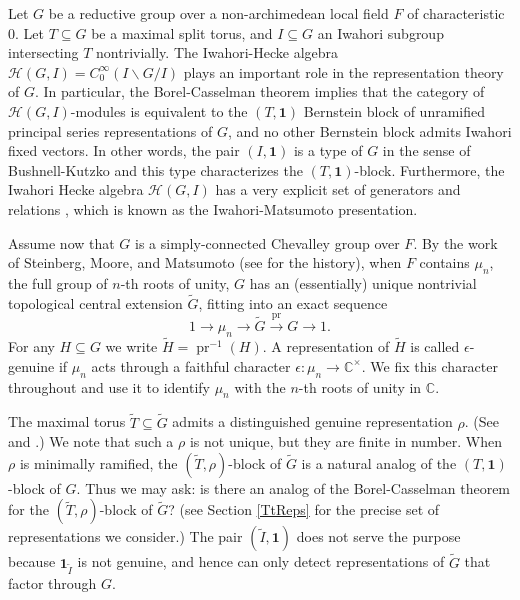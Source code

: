 \documentclass[10pt, letterpaper]{amsart}
\theoremstyle{plain}
\theoremstyle{definition}
\numberwithin{equation}{section}
\newcommand{\pr}{\operatorname{pr}}
\newcommand{\Gt}{\widetilde{G}}
\newcommand{\Ht}{\widetilde{H}}
\newcommand{\It}{\widetilde{I}}
\newcommand{\Tt}{\widetilde{T}}
\newcommand{\Hcal}{\mathcal{H}}
\newcommand{\one}{\mathbf{1}}
\begin{document}
Let $G$ be a reductive group over a non-archimedean local field $F$ of characteristic 0. Let $T\subseteq G$ be a maximal split torus, and $I\subseteq G$ an Iwahori subgroup intersecting $T$ nontrivially. The Iwahori-Hecke algebra $\Hcal(G, I)=C_0^\infty(I\backslash G\slash I)$ plays an important role in the representation theory of $G$. In particular, the Borel-Casselman theorem \cite[Theorem 4.10]{B76} implies that the category of $\Hcal(G, I)$-modules is equivalent to the $(T,\one)$ Bernstein block of unramified principal series representations of $G$, and no other Bernstein block admits Iwahori fixed vectors. In other words, the pair $(I, \one)$ is a type of $G$ in the sense of Bushnell-Kutzko \cite[(4.1) Definition]{BK98} and this type characterizes the $(T,\one)$-block. Furthermore, the Iwahori Hecke algebra $\Hcal(G, I)$ has a very explicit set of generators and relations \cite{IM}, which is known as the Iwahori-Matsumoto presentation.

Assume now that $G$ is a simply-connected Chevalley group over $F$. By the work of Steinberg, Moore, and Matsumoto (see \cite{GGW18} for the history), when $F$ contains $\mu_{n}$, the full group of $n$-th roots of unity, $G$ has an (essentially) unique nontrivial topological central extension $\Gt$, fitting into an exact sequence
\begin{equation}\label{CExtIntro}
    1\longrightarrow\mu_n\longrightarrow\Gt\stackrel{\pr}{\longrightarrow} G\longrightarrow 1.
\end{equation}
For any $H\subseteq G$ we write $\Ht=\pr^{-1}(H)$. A representation of $\Ht$ is called $\epsilon$-genuine if $\mu_{n}$ acts through a faithful character $\epsilon:\mu_{n}\rightarrow \mathbb{C}^{\times}$. We fix this character throughout and use it to identify $\mu_{n}$ with the $n$-th roots of unity in $\mathbb{C}$.

The maximal torus $\Tt\subseteq \Gt$ admits a distinguished genuine representation $\rho$. (See \cite{S04} and \cite[Section 6, Theorems 6.6, 6.8]{GG18}.) We note that such a $\rho$ is not unique, but they are finite in number. When $\rho$ is minimally ramified, the $(\Tt,\rho)$-block of $\Gt$ is a natural analog of the $(T,\one)$-block of $G$. Thus we may ask: is there an analog of the Borel-Casselman theorem for the $(\Tt,\rho)$-block of $\Gt$? (see Section \ref{TtReps} for the precise set of representations we consider.) The pair $(\It, \one)$ does not serve the purpose because $\one_{\It}$ is not genuine, and hence can only detect representations of $\Gt$ that factor through $G$. 
\end{document}
